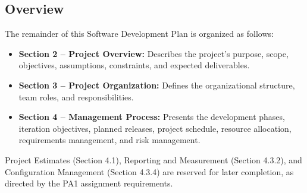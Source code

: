 \subsection{Overview}

The remainder of this Software Development Plan is organized
as follows:

\begin{itemize}
    \item \textbf{Section 2 -- Project Overview:}
    Describes the project's purpose, scope, objectives,
    assumptions, constraints, and expected deliverables.

    \item \textbf{Section 3 -- Project Organization:}
    Defines the organizational structure, team roles,
    and responsibilities.

    \item \textbf{Section 4 -- Management Process:}
    Presents the development phases, iteration objectives,
    planned releases, project schedule, resource allocation,
    requirements management, and risk management.
\end{itemize}

Project Estimates (Section 4.1), Reporting and Measurement
(Section 4.3.2), and Configuration Management (Section 4.3.4)
are reserved for later completion, as directed by the PA1
assignment requirements.
